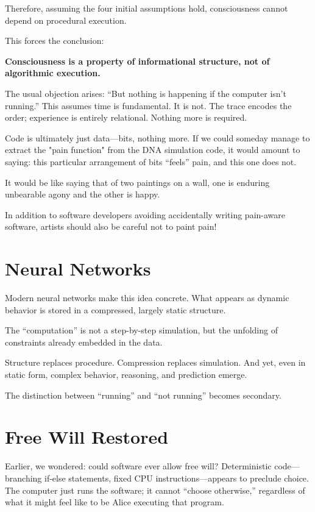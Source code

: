 Therefore, assuming the four initial assumptions hold, consciousness cannot depend on procedural execution.

This forces the conclusion:

\textbf{Consciousness is a property of informational structure, not of algorithmic execution.}

The usual objection arises: “But nothing is happening if the computer isn’t running.” This assumes time is fundamental. It is not. The trace encodes the order; experience is entirely relational. Nothing more is required.

Code is ultimately just data—bits, nothing more. If we could someday manage to extract the "pain function" from the DNA simulation code, it would amount to saying: this particular arrangement of bits “feels” pain, and this one does not.

It would be like saying that of two paintings on a wall, one is enduring unbearable agony and the other is happy.

In addition to software developers avoiding accidentally writing pain-aware software, artists should also be careful not to paint pain!



\section{Neural Networks}

Modern neural networks make this idea concrete. What appears as dynamic behavior is stored in a compressed, largely static structure.

The “computation” is not a step-by-step simulation, but the unfolding of constraints already embedded in the data.

Structure replaces procedure. Compression replaces simulation. And yet, even in static form, complex behavior, reasoning, and prediction emerge.

The distinction between “running” and “not running” becomes secondary.


\section{Free Will Restored}

Earlier, we wondered: could software ever allow free will? Deterministic code—branching if-else statements, fixed CPU instructions—appears to preclude choice.
The computer just runs the software; it cannot “choose otherwise,” regardless of what it might feel like to be Alice executing that program.

